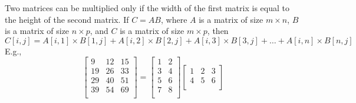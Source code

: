 \documentclass[12pt,pdftex]{article}
\begin{document}
Two matrices can be multiplied only if the width of the first matrix
is equal to the height of the second matrix.  If $C = A B$, where $A$
is a matrix of size $m \times n$, $B$ is a matrix of size $n \times p$, 
and $C$ is a matrix of size $m \times p$, then 
\[C[i,j] = A[i,1]\times B[1,j] + A[i,2]\times B[2,j] + A[i,3]\times B[3,j] + 
  \ldots + A[i,n]\times B[n,j]\]
E.g., 
\[\left[ 
\begin{array}{ccc}
9 & 12 & 15 \\
19 & 26 & 33 \\
29 & 40 & 51 \\
39 & 54 & 69 \\
\end{array}\right]
=
\left[\begin{array}{cc}
1 & 2 \\
3 & 4 \\
5 & 6 \\
7 & 8 \\
\end{array}\right]
\left[\begin{array}{ccc}
1 & 2 & 3\\
4 & 5 & 6 \\
\end{array}\right]\]
\end{document}
